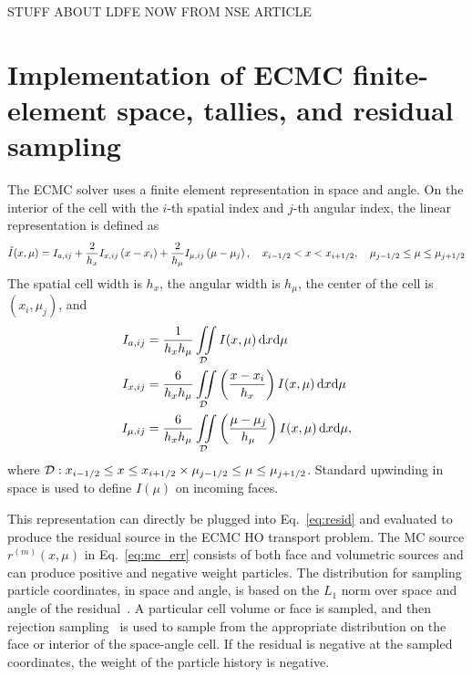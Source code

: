 STUFF ABOUT LDFE NOW FROM NSE ARTICLE



\section{Implementation of ECMC finite-element space, tallies, and residual sampling}

\label{app:tallies}

The ECMC solver uses a finite element representation in space and angle. On the
interior of the cell with the $i$-th spatial index and $j$-th angular index, the linear representation is defined as
\begin{equation*}
    \tilde I(x,\mu) = I_{a,ij} + \frac{2}{h_x}I_{x,ij}\left(x-x_i\right) +
    \frac{2}{h_\mu}I_{\mu,ij}\left(\mu-\mu_j\right), \quad x_{{i-1/2}} <  x < x_{{i+1/2}},\quad
     \mu_{j-1/2} \leq \mu \leq \mu_{j+1/2}
\end{equation*}
The spatial cell width is $h_x$, the angular width is
$h_\mu$, the center of the cell is $(x_i,\mu_j)$, and
\begin{align}\label{app1}
    I_{a,ij} &= \frac{1}{h_x h_\mu} \iint\limits_{\mathcal{D}} I(x,\mu)\, \mathrm{d} x \mathrm{d} \mu \\
    I_{x,ij} &= \frac{6}{h_xh_\mu}\iint\limits_{\mathcal{D}} \left(\frac{x - x_i}{h_{x}}\right)
    I(x,\mu)\, \mathrm{d} x \mathrm{d} \mu \\ \label{app2}
    I_{\mu,ij} &= \frac{6}{h_xh_\mu}\iint\limits_{\mathcal{D}}
     \left(\frac{\mu - \mu_j}{h_{\mu}}\right)
    I(x,\mu)\, \mathrm{d} x \mathrm{d} \mu,
\end{align}
where $\mathcal{D}: x_{{i-1/2}} \leq  x \leq  x_{{i+1/2}} \times \mu_{j-1/2} \leq \mu \leq \mu_{j+1/2}$.
Standard upwinding in space is used to
define $I(\mu)$ on incoming faces. 

This representation can directly be plugged into
Eq.~\eqref{eq:resid} and evaluated to produce the residual source in the ECMC HO transport
problem.  The MC source $r^{(m)}(x,\mu)$ in Eq.~\eqref{eq:mc_err}
consists of both face and volumetric sources and can produce positive and
negative weight particles.  The distribution for sampling particle coordinates, in space and angle, is based on the $L_1$
norm over space and angle of the residual~\cite{jake}.  A particular cell volume or face 
is sampled, and then rejection sampling~\cite{shultis_mc} is used to sample from
the appropriate distribution on the face or interior of the space-angle cell.  If the
residual is negative at the sampled coordinates, the weight of the particle history is negative.

